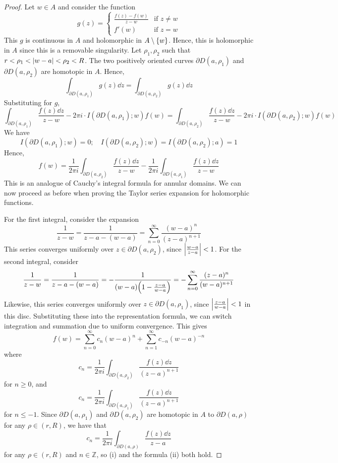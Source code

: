 \begin{proof}
	Let \( w \in A \) and consider the function
	\[
		g(z) = \begin{cases}
			\frac{f(z) - f(w)}{z-w} & \text{if } z \neq w \\
			f'(w)                   & \text{if } z = w
		\end{cases}
	\]
	This \( g \) is continuous in \( A \) and holomorphic in \( A \setminus \qty{w} \).
	Hence, this is holomorphic in \( A \) since this is a removable singularity.
	Let \( \rho_1, \rho_2 \) such that \( r < \rho_1 < \abs{w - a} < \rho_2 < R \).
	The two positively oriented curves \( \partial D(a,\rho_1) \) and \( \partial D(a,\rho_2) \) are homotopic in \( A \).
	Hence,
	\[
		\int_{\partial D(a,\rho_1)} g(z) \dd{z} = \int_{\partial D(a,\rho_2)} g(z) \dd{z}
	\]
	Substituting for \( g \),
	\[
		\int_{\partial D(a,\rho_1)} \frac{f(z) \dd{z}}{z-w} - 2\pi i \cdot I(\partial D(a,\rho_1);w) f(w) = \int_{\partial D(a,\rho_2)} \frac{f(z) \dd{z}}{z-w} - 2\pi i \cdot I(\partial D(a,\rho_2);w) f(w)
	\]
	We have
	\[
		I(\partial D(a,\rho_1);w) = 0;\quad I(\partial D(a,\rho_2);w) = I(\partial D(a,\rho_2);a) = 1
	\]
	Hence,
	\[
		f(w) = \frac{1}{2\pi i} \int_{\partial D(a,\rho_2)} \frac{f(z) \dd{z}}{z-w} - \frac{1}{2\pi i}\int_{\partial D(a,\rho_1)} \frac{f(z) \dd{z}}{z-w}
	\]
	This is an analogue of Cauchy's integral formula for annular domains.
	We can now proceed as before when proving the Taylor series expansion for holomorphic functions.

	For the first integral, consider the expansion
	\[
		\frac{1}{z-w} = \frac{1}{z-a-(w-a)} = \sum_{n=0}^\infty \frac{(w-a)^n}{(z-a)^{n+1}}
	\]
	This series converges uniformly over \( z \in \partial D(a,\rho_2) \), since \( \abs{\frac{w-a}{z-a}} < 1 \).
	For the second integral, consider
	\[
		\frac{1}{z-w} = \frac{1}{z-a-(w-a)} = -\frac{1}{(w-a)\qty(1-\frac{z-a}{w-a})} = -\sum_{n=0}^\infty \frac{(z-a)^n}{(w-a)^{n+1}}
	\]
	Likewise, this series converges uniformly over \( z \in \partial D(a,\rho_1) \), since \( \abs{\frac{z-a}{w-a}} < 1 \) in this disc.
	Substituting these into the representation formula, we can switch integration and summation due to uniform convergence.
	This gives
	\[
		f(w) = \sum_{n=0}^\infty c_n (w-a)^n + \sum_{n=1}^\infty c_{-n} (w-a)^{-n}
	\]
	where
	\[
		c_n = \frac{1}{2\pi i} \int_{\partial D(a,\rho_2)} \frac{f(z) \dd{z}}{(z-a)^{n+1}}
	\]
	for \( n \geq 0 \), and
	\[
		c_n = \frac{1}{2\pi i} \int_{\partial D(a,\rho_1)} \frac{f(z) \dd{z}}{(z-a)^{n+1}}
	\]
	for \( n \leq -1 \).
	Since \( \partial D(a,\rho_1) \) and \( \partial D(a,\rho_2) \) are homotopic in \( A \) to \( \partial D(a,\rho) \) for any \( \rho \in (r,R) \), we have that
	\[
		c_n = \frac{1}{2\pi i} \int_{\partial D(a,\rho)} \frac{f(z) \dd{z}}{z-a}
	\]
	for any \( \rho \in (r,R) \) and \( n \in \mathbb Z \), so (i) and the formula (ii) both hold.


\end{proof}

